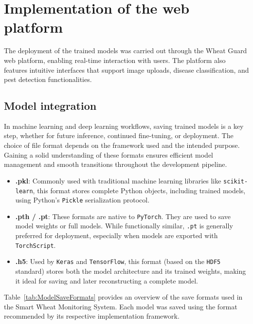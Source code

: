 \section{Implementation of the web platform}
The deployment of the trained models was carried out through the Wheat Guard web platform, enabling real-time interaction with users. The platform also features intuitive interfaces that support image uploads, disease classification, and pest detection functionalities.
\subsection{Model integration}
In machine learning and deep learning workflows, saving trained models is a key step, whether for future inference, continued fine-tuning, or deployment. The choice of file format depends on the framework used and the intended purpose. Gaining a solid understanding of these formats ensures efficient model management and smooth transitions throughout the development pipeline.

\begin{itemize}
    \item \textbf{.pkl}: Commonly used with traditional machine learning libraries like \texttt{scikit-learn}, this format stores complete Python objects, including trained models, using Python’s \texttt{Pickle} serialization protocol.

    \item \textbf{.pth / .pt}: These formats are native to \texttt{PyTorch}. They are used to save model weights or full models. While functionally similar, \texttt{.pt} is generally preferred for deployment, especially when models are exported with \texttt{TorchScript}.

    \item \textbf{.h5}: Used by \texttt{Keras} and \texttt{TensorFlow}, this format (based on the \texttt{HDF5} standard) stores both the model architecture and its trained weights, making it ideal for saving and later reconstructing a complete model.
\end{itemize}

Table~\ref{tab:ModelSaveFormats} provides an overview of the save formats used in the Smart Wheat Monitoring System. Each model was saved using the format recommended by its respective implementation framework.

